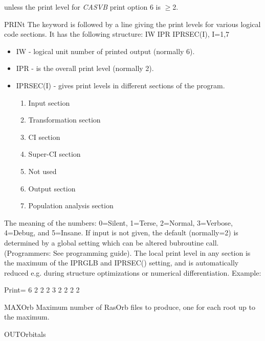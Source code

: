 \begin{keywordlist}
unless the print level for {\em CASVB} print option 6 is $\geq$2.
\item[PRINt]
The keyword is followed by a line giving the print
levels for various logical code sections. It has the following structure:
IW IPR IPRSEC(I), I=1,7
\begin{itemize}
\item IW -{} logical unit number of printed output (normally 6).
\item IPR -{} is the overall print level (normally 2).
\item IPRSEC(I) -{} gives print levels in different sections of the program.
\begin{enumerate}
\item Input section
\item Transformation section
\item CI section
\item Super-{}CI section
\item Not used
\item Output section
\item Population analysis section
\end{enumerate}
\end{itemize}
The meaning of the numbers: 0=Silent, 1=Terse, 2=Normal, 3=Verbose, 4=Debug,
and 5=Insane. If input is not given, the default (normally=2) is determined
by a global setting which can be altered bubroutine call.
(Programmers: See programming guide). The local print level in any section is
the maximum of the IPRGLB and IPRSEC() setting, and is automatically reduced
e.g. during structure optimizations or numerical differentiation. Example:
\begin{inputlisting}
Print= 6 2 2 2 3 2 2 2 2
\end{inputlisting}
\item[MAXOrb]
Maximum number of RasOrb files to produce, one for each root up to the maximum.
\item[OUTOrbitals]

\end{keywordlist}
